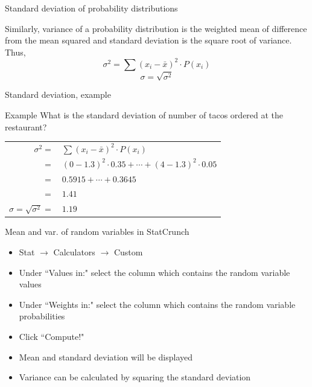 \documentclass[xcolor=table]{beamer}
\begin{document}
\begin{frame}{Standard deviation of probability distributions}
\begin{block}{}
Similarly, variance of a probability distribution is the weighted mean of difference from the mean squared and standard deviation is the square root of variance.\\
\medskip
Thus,
\[\sigma^2 = \sum (x_i - \bar x )^2 \cdot P(x_i)\]
\[\sigma = \sqrt{\sigma^2}\]
\end{block}
\end{frame}

\begin{frame}{Standard deviation, example}
\begin{exampleblock}{Example}
What is the standard deviation of number of tacos ordered at the restaurant?\\
\medskip
\pause
{\centering \renewcommand{\arraystretch}{1}
\begin{tabular}{r l}
$\sigma^2 =$ & $\sum (x_i - \bar x )^2 \cdot P(x_i)$\\
$=$ & $(0-1.3)^2 \cdot 0.35 + \cdots + (4-1.3)^2 \cdot 0.05$\\
$=$ & $0.5915 + \cdots + 0.3645$\\
$=$ & $1.41$\\
\pause$\sigma = \sqrt{\sigma^2} = $ & $1.19$
\end{tabular}\par
\renewcommand{\arraystretch}{1.5}}
\end{exampleblock}
\end{frame}

\begin{frame}{Mean and var. of random variables in StatCrunch}
\begin{block}{}
\begin{itemize}
\item Stat $\to$ Calculators $\to$ Custom
\item Under ``Values in:" select the column which contains the random variable values
\item Under ``Weights in:" select the column which contains the random variable probabilities
\item Click ``Compute!"
\item Mean and standard deviation will be displayed
\item Variance can be calculated by squaring the standard deviation
\end{itemize}
\end{block}
\end{frame}
\end{document}
